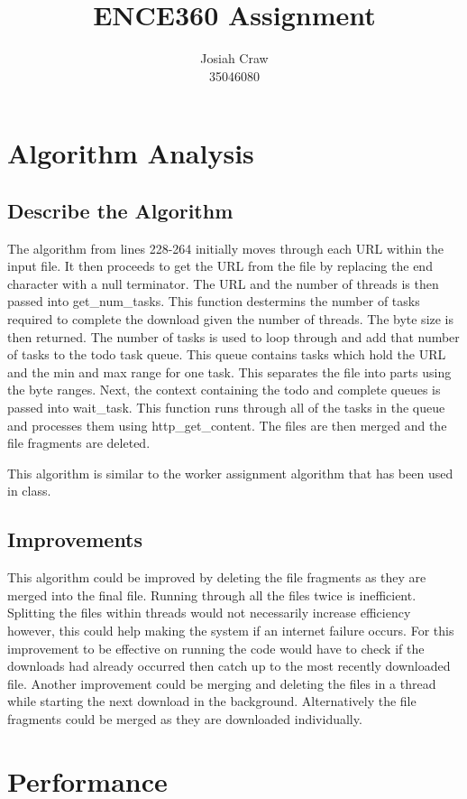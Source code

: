 \documentclass[12pt]{article}
\author{Josiah Craw\\35046080}
\title{\huge{ENCE360 Assignment}}
\begin{document}
\maketitle

\newpage

\section{Algorithm Analysis}
\subsection{Describe the Algorithm}
The algorithm from lines 228-264 initially moves through each URL within the input file. It then
proceeds to get the URL from the file by replacing the end character with a null terminator. The
URL and the number of threads is then passed into get\_num\_tasks. This function destermins the
number of tasks required to complete the download given the number of threads. The byte size is
then returned. The number of tasks is used to loop through and add that number of tasks to the
todo task queue. This queue contains tasks which hold the URL and the min and max range for one
task. This separates the file into parts using the byte ranges. Next, the context containing the
todo and complete queues is passed into wait\_task. This function runs through all of the tasks in
the queue and processes them using http\_get\_content. The files are then merged and the file
fragments are deleted.

This algorithm is similar to the worker assignment algorithm that has been used in class.

\subsection{Improvements}
This algorithm could be improved by deleting the file fragments as they are merged into the final
file. Running through all the files twice is inefficient. Splitting the files within threads would
not necessarily increase efficiency however, this could help making the system if an internet
failure occurs. For this improvement to be effective on running the code would have to check if
the downloads had already occurred then catch up to the most recently downloaded file. Another
improvement could be merging and deleting the files in a thread while starting the next download
in the background. Alternatively the file fragments could be merged as they are downloaded
individually. 

\section{Performance}
\end{document}
